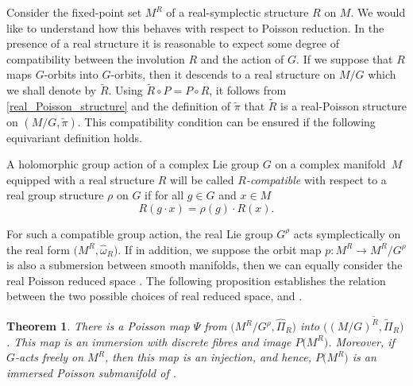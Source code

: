 \documentclass[pdftex]{sigma}
\numberwithin{equation}{section}
\newtheorem{Theorem}{Theorem}[section]
\begin{document}
Consider the fixed-point set $M^R$ of a real-symplectic structure $R$ on $M$. We would like to understand how this behaves with respect to Poisson reduction. In the presence of a real structure it is reasonable to expect some degree of compatibility between the involution $R$ and the action of $G$. If we suppose that $R$ maps $G$-orbits into $G$-orbits, then it descends to a real structure on $M/G$ which we shall denote by $\widetilde{R}$. Using $\widetilde{R}\circ P=P\circ R$, it follows from \eqref{real_Poisson_structure} and the definition of $\widetilde{\pi}$ that $\widetilde{R}$ is a real-Poisson structure on $(M/G,\widetilde{\pi})$. This compatibility condition can be ensured if the following equivariant definition holds.
\begin{Definition}%
	A holomorphic group action of a complex Lie group $G$ on a complex manifold~$M$ equipped with a real structure $R$ will be called \emph{$R$-compatible} with respect to a real group structure $\rho$ on $G$ if for all $g\in G$ and $x\in M$
	\begin{equation}
		\label{equivariant_condition}
		R(g\cdot x)=\rho(g)\cdot R(x).
	\end{equation}
\end{Definition}

For such a compatible group action, the real Lie group $G^\rho$ acts symplectically on the real form $\bigl(M^R,\widehat{\omega}_R\bigr)$. If in addition, we suppose the orbit map $p\colon M^R\rightarrow M^R/G^\rho$ is also a submersion between smooth manifolds, then we can equally consider the real Poisson reduced space . The following proposition establishes the relation between the two possible choices of real reduced space,  and .

\begin{Theorem}\label{reductionthm}
	There is a Poisson map $\Psi$ from $\bigl(M^R/G^\rho,\widehat{\Pi}_R\bigr)$ into $\bigl((M/G)^{\widetilde{R}},\widetilde{\Pi}_R\bigr)$. This map is an immersion with discrete fibres and image $P\bigl(M^R\bigr)$. Moreover, if $G$-acts freely on $M^R$, then this map is an injection, and hence, $P\bigl(M^R\bigr)$ is an immersed Poisson submanifold of .
\end{Theorem}
\end{document}
